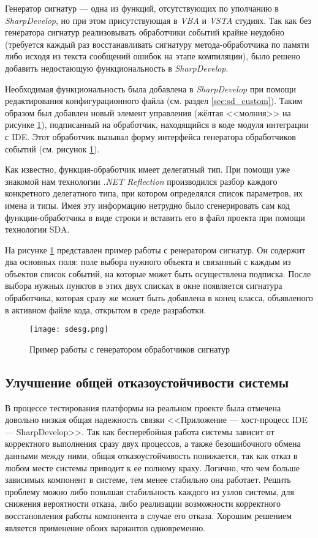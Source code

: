 Генератор сигнатур --- одна из функций, отсутствующих по уполчанию в {\it SharpDevelop}, но при этом присутствующая в {\it VBA} и {\it VSTA} студиях. Так как без генератора сигнатур реализовывать обработчики событий крайне неудобно (требуется каждый раз восстанавливать сигнатуру метода-обработчика по памяти либо исходя из текста сообщений ошибок на этапе компиляции), было решено добавить недостающую функциональность в {\it SharpDevelop}.

Необходимая функциональность была добавлена в {\it SharpDevelop} при помощи редактирования конфигурационного файла (см. раздел \ref{sec:sd_custom}). Таким образом был добавлен новый элемент управления (жёлтая <<молния>> на рисунке \ref{pic:sdesg}), подписанный на обработчик, находящийся в коде модуля интеграции с IDE. Этот обработчик вызывал форму интерфейса генератора обработчиков событий (см. рисунок \ref{pic:sdesg}).

Как известно, функция-обработчик имеет делегатный тип. При помощи уже знакомой нам технологии {\it .NET Reflection} производился разбор каждого конкретного делегатного типа, при котором определялся список параметров, их имена и типы. Имея эту информацию нетрудно было сгенерировать сам код функции-обработчика в виде строки и вставить его в файл проекта при помощи технологии SDA.

На рисунке \ref{pic:sdesg} представлен пример работы с ренератором сигнатур. Он содержит два основных поля: поле выбора нужного объекта и связанный с каждым из объектов список событий, на которые может быть осуществлена подписка. После выбора нужных пунктов в этих двух списках в окне появляется сигнатура обработчика, которая сразу же может быть добавлена в конец класса, объявленого в активном файле кода, открытом в среде разработки.

\begin{figure}[!h]
    \centering
    \texttt{[image: sdesg.png]}
    \caption{Пример работы с генератором обработчиков сигнатур}
    \label{pic:sdesg}
\end{figure}

 
\subsection{Улучшение общей отказоустойчивости системы}
\label{sec:stability}

В процессе тестирования платформы на реальном проекте была отмечена довольно низкая общая надежность связки <<Приложение --- хост-процесс IDE --- SharpDevelop>>. Так как бесперебойная работа системы зависит от корректного выполнения сразу двух процессов, а также безошибочного обмена данными между ними, общая отказоустойчивость понижается, так как отказ в любом месте системы приводит к ее полному краху. Логично, что чем больше зависимых компонент в системе, тем менее стабильно она работает. Решить проблему можно либо повышая стабильность каждого из узлов системы, для снижения вероятности отказа, либо реализации возможности корректного восстановления работы компонента в случае его отказа. Хорошим решением является применение обоих вариантов одновременно.

